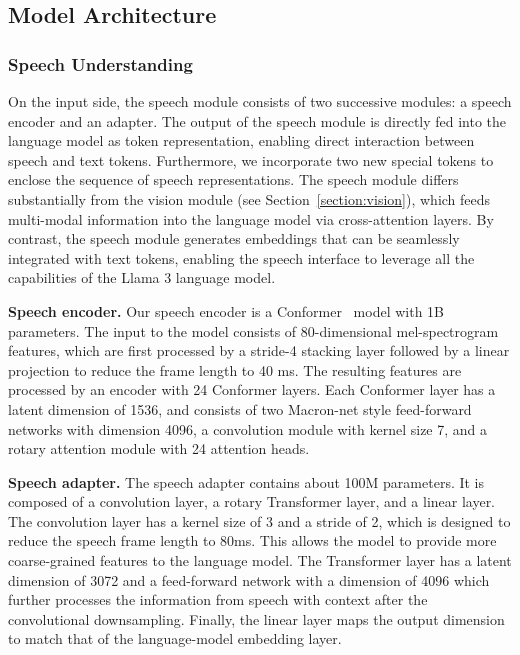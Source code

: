 \documentclass[dvipsnames]{fairmeta}
\begin{document}
\subsection{Model Architecture}

\subsubsection{Speech Understanding}

On the input side, the speech module consists of two successive modules: a speech encoder and an adapter.
The output of the speech module is directly fed into the language model as token representation, enabling direct interaction between speech and text tokens.
Furthermore, we incorporate two new special tokens to enclose the sequence of speech representations.
The speech module differs substantially from the vision module (see Section~\ref{section:vision}), which feeds multi-modal information into the language model via cross-attention layers. 
By contrast, the speech module generates embeddings that can be seamlessly integrated with text tokens, enabling the speech interface to leverage all the capabilities of the Llama 3 language model.

\textbf{Speech encoder.}
Our speech encoder is a Conformer~\citep{gulati2020conformer} model with 1B parameters.
The input to the model consists of 80-dimensional mel-spectrogram features, which are first processed by a stride-4 stacking layer followed by a linear projection to reduce the frame length to 40 ms.
The resulting features are processed by an encoder with 24 Conformer layers.
Each Conformer layer has a latent dimension of 1536, and consists of two Macron-net style feed-forward networks with dimension 4096, a convolution module with kernel size 7, and a rotary attention module \citep{su2024roformer} with 24 attention heads.

\textbf{Speech adapter.}
The speech adapter contains about 100M parameters. It is composed of a convolution layer, a rotary Transformer layer, and a linear layer.
The convolution layer has a kernel size of 3 and a stride of 2, which is designed to  reduce the speech frame length to 80ms. This allows the model to provide more coarse-grained features to the language model.
The Transformer layer has a latent dimension of 3072 and a feed-forward network with a dimension of 4096 which further processes the information from speech with context after the convolutional downsampling.
Finally, the linear layer maps the output dimension to match that of the language-model embedding layer.
\end{document}
